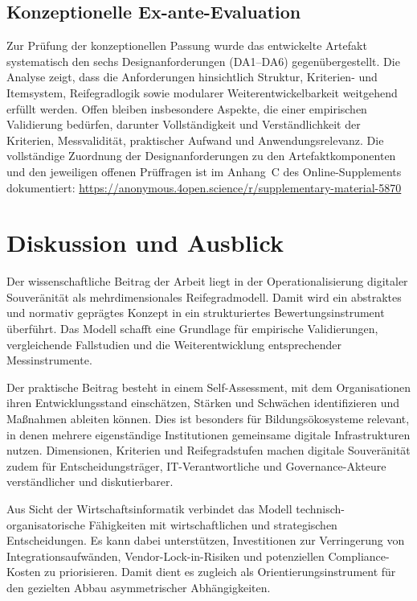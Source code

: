 \documentclass[10pt,a4paper]{article}
\begin{document}
\subsection{Konzeptionelle Ex-ante-Evaluation}

Zur Prüfung der konzeptionellen Passung wurde das entwickelte Artefakt systematisch den sechs Designanforderungen (DA1--DA6) gegenübergestellt. Die Analyse zeigt, dass die Anforderungen hinsichtlich Struktur, Kriterien- und Itemsystem, Reifegradlogik sowie modularer Weiterentwickelbarkeit weitgehend erfüllt werden. Offen bleiben insbesondere Aspekte, die einer empirischen Validierung bedürfen, darunter Vollständigkeit und Verständlichkeit der Kriterien, Messvalidität, praktischer Aufwand und Anwendungsrelevanz. Die vollständige Zuordnung der Designanforderungen zu den Artefaktkomponenten und den jeweiligen offenen Prüffragen ist im Anhang~C des Online-Supplements dokumentiert:\newline
\url{https://anonymous.4open.science/r/supplementary-material-5870}

\section{Diskussion und Ausblick}

Der wissenschaftliche Beitrag der Arbeit liegt in der Operationalisierung digitaler Souveränität als mehrdimensionales Reifegradmodell. Damit wird ein abstraktes und normativ geprägtes Konzept in ein strukturiertes Bewertungsinstrument überführt. Das Modell schafft eine Grundlage für empirische Validierungen, vergleichende Fallstudien und die Weiterentwicklung entsprechender Messinstrumente.

Der praktische Beitrag besteht in einem Self-Assessment, mit dem Organisationen ihren Entwicklungsstand einschätzen, Stärken und Schwächen identifizieren und Maßnahmen ableiten können. Dies ist besonders für Bildungsökosysteme relevant, in denen mehrere eigenständige Institutionen gemeinsame digitale Infrastrukturen nutzen. Dimensionen, Kriterien und Reifegradstufen machen digitale Souveränität zudem für Entscheidungsträger, IT-Verantwortliche und Governance-Akteure verständlicher und diskutierbarer.

Aus Sicht der Wirtschaftsinformatik verbindet das Modell technisch-organisatorische Fähigkeiten mit wirtschaftlichen und strategischen Entscheidungen. Es kann dabei unterstützen, Investitionen zur Verringerung von Integrationsaufwänden, Vendor-Lock-in-Risiken und potenziellen Compliance-Kosten zu priorisieren. Damit dient es zugleich als Orientierungsinstrument für den gezielten Abbau asymmetrischer Abhängigkeiten.
\end{document}
